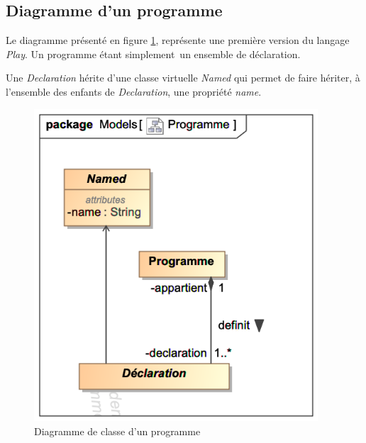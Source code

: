 
\subsection{Diagramme d'un programme}
\label{sec:question6}

Le diagramme présenté en figure \ref{fig:program}, représente une première version du langage \emph{Play}.
Un programme étant \guillemotleft simplement\guillemotright\ un ensemble de déclaration.

Une \emph{Declaration} hérite d'une classe virtuelle \emph{Named} qui permet de faire hériter, à l'ensemble des enfants de \emph{Declaration}, une propriété \emph{name}. 

\begin{figure}[h!]
	\centering
	\includegraphics[width=300pt]{assets/class__Programme}
	\caption{Diagramme de classe d'un programme}
	\label{fig:program}
\end{figure}
